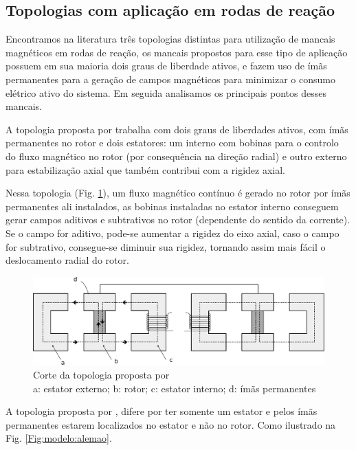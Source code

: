 \subsection{Topologias com aplicação em rodas de reação}

Encontramos na literatura três topologias distintas para utilização de mancais magnéticos em rodas de reação, os mancais propostos para esse tipo de aplicação possuem em sua maioria dois graus de liberdade ativos,  e fazem uso de ímãs permanentes para a geração de campos magnéticos para minimizar o consumo elétrico ativo do sistema. Em seguida analisamos os principais pontos desses mancais.

A topologia proposta por \citet{Bernus1998} trabalha com dois graus de liberdades ativos, com ímãs permanentes no rotor e dois estatores: um interno com bobinas para o controlo do fluxo magnético no rotor (por consequência na direção radial) e outro externo para estabilização axial que também contribui com a rigidez axial. 

Nessa topologia (Fig. \ref{Fig:modelo:frances}), um fluxo magnético contínuo é gerado no rotor por ímãs permanentes ali instalados, as bobinas instaladas no estator interno conseguem gerar campos aditivos e subtrativos no rotor (dependente do sentido da corrente). Se o campo for aditivo, pode-se aumentar a rigidez do eixo axial, caso o campo for subtrativo, consegue-se diminuir sua rigidez, tornando assim mais fácil o deslocamento radial do rotor.

\begin{figure}[!ht]
	\centering
	\includegraphics[width=1\linewidth]{./Figs/mancais/frances}
	\caption{Corte da topologia proposta por \cite{Bernus1998} \\
	a: estator externo; b: rotor; c: estator interno; d: ímãs permanentes}
	\label{Fig:modelo:frances}
\end{figure}

A topologia proposta por \citet{Scharfe2001}, difere por ter somente um estator e pelos ímãs permanentes estarem localizados no estator e não no rotor. Como ilustrado na Fig. \ref{Fig:modelo:alemao}. 

